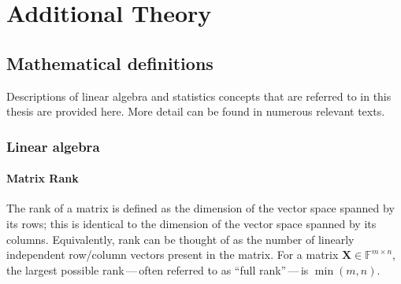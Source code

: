 \chapter{Additional Theory}
\label{chap:additional-theory}

\section{Mathematical definitions}
\label{sec:maths-defs}
Descriptions of linear algebra and statistics concepts that are referred to in
this thesis are provided here. More detail can be found in numerous relevant
texts\cite{Strang2018,Pawitan2001}.

\subsection{Linear algebra}
\label{subsec:linear-algebra}

\subsubsection{Matrix Rank}
The rank of a matrix is defined as the dimension of the vector space spanned by
its rows; this is identical to the dimension of the vector space spanned by
its columns. Equivalently, rank can be thought of as the number of linearly
independent row/column vectors present in the matrix. For a matrix $\symbf{X}
\in \mathbb{F}^{m \times n}$, the largest possible rank\,---\,often referred to
as ``full rank''\,---\,is $\min(m, n)$.

